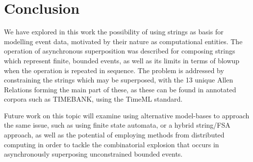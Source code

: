 \documentclass[a4paper,11pt,leqno]{article}
\begin{document}
\section{Conclusion}\label{conclusion}
We have explored in this work the possibility of using strings as basis for 
modelling event data, motivated by their nature as computational entities. The 
operation of asynchronous superposition was described for composing strings 
which represent finite, bounded events, as well as its limits in terms of 
blowup when the operation is repeated in sequence. The problem is addressed by 
constraining the strings which may be superposed, with the 13 unique 
Allen Relations forming the main part of these, as these can be found in 
annotated corpora such as TIMEBANK, using the TimeML standard.

Future work on this topic will examine using alternative model-bases to 
approach the same issue, such as using finite state automata, or a hybrid 
string/FSA approach, as well as the potential of employing methods from 
distributed computing in order to tackle the combinatorial explosion that 
occurs in asynchronously superposing unconstrained bounded events.
{}

\end{document}
